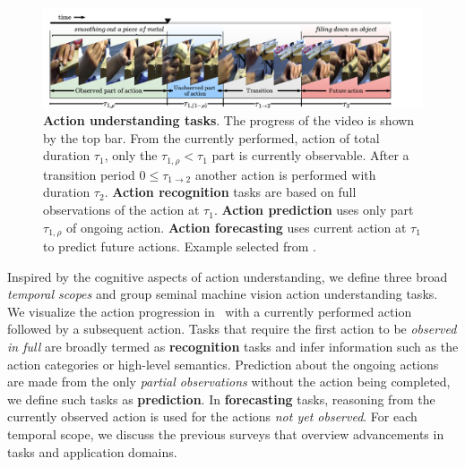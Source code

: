 \documentclass[smallextended,twocolumn,natbib]{svjour3}
\begin{document}
\begin{figure}[t]
    \centering
    \includegraphics[width=\linewidth,trim={1cm 0 6cm 0},clip]{figs/action_understanding_tasks.pdf}
    \caption{\textbf{Action understanding tasks}. The progress of the video is shown by the top bar. From the currently performed, action of total duration $\tau_1$, only the $\tau_{1,\rho}<\tau_1 $ part is currently observable. After a transition period $0\leq\tau_{1 \rightarrow 2}$ another action is performed with duration $\tau_2$. \textbf{Action recognition} tasks are based on full observations of the action at $\tau_1$. \textbf{Action prediction} uses only part $\tau_{1,\rho}$ of ongoing action. \textbf{Action forecasting} uses current action at $\tau_1$ to predict future actions. Example selected from \citep{wang2019vatex}.} 
    \label{fig:tasks}
\end{figure}

Inspired by the cognitive aspects of action understanding, we define three broad \emph{temporal scopes} and group seminal machine vision action understanding tasks. We visualize the action progression in~ with a currently performed action followed by a subsequent action. Tasks that require the first action to be \emph{observed in full} are broadly termed as \textbf{recognition} tasks and infer information such as the action categories or high-level semantics. Prediction about the ongoing actions are made from the only \emph{partial observations} without the action being completed, we define such tasks as \textbf{prediction}. In \textbf{forecasting} tasks, reasoning from the currently observed action is used for the actions \emph{not yet observed}. For each temporal scope, we discuss the previous surveys that overview advancements in tasks and application domains.
\end{document}
